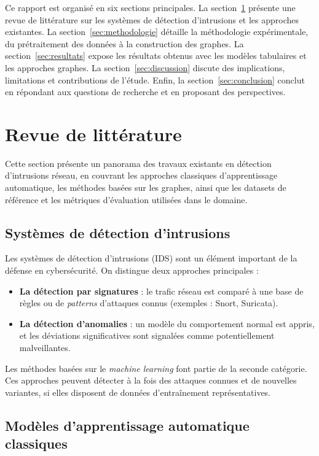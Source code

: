 ﻿\documentclass[11pt,a4paper]{article}
\begin{document}
Ce rapport est organisé en six sections principales. La section~\ref{sec:revue} présente une revue de littérature sur les systèmes de détection d'intrusions et les approches existantes. La section~\ref{sec:methodologie} détaille la méthodologie expérimentale, du prétraitement des données à la construction des graphes. La section~\ref{sec:resultats} expose les résultats obtenus avec les modèles tabulaires et les approches graphes. La section~\ref{sec:discussion} discute des implications, limitations et contributions de l'étude. Enfin, la section~\ref{sec:conclusion} conclut en répondant aux questions de recherche et en proposant des perspectives.

\section{Revue de littérature}
\label{sec:revue}

Cette section présente un panorama des travaux existants en détection d'intrusions réseau, en couvrant les approches classiques d'apprentissage automatique, les méthodes basées sur les graphes, ainsi que les datasets de référence et les métriques d'évaluation utilisées dans le domaine.

\subsection{Systèmes de détection d'intrusions}

Les systèmes de détection d'intrusions (IDS) sont un élément important de la défense en cybersécurité. On distingue deux approches principales :
\begin{itemize}
    \item \textbf{La détection par signatures} : le trafic réseau est comparé à une base de règles ou de \emph{patterns} d'attaques connus (exemples : Snort, Suricata).
    \item \textbf{La détection d'anomalies} : un modèle du comportement normal est appris, et les déviations significatives sont signalées comme potentiellement malveillantes.
\end{itemize}

Les méthodes basées sur le \emph{machine learning} font partie de la seconde catégorie. Ces approches peuvent détecter à la fois des attaques connues et de nouvelles variantes, si elles disposent de données d'entraînement représentatives.

\subsection{Modèles d'apprentissage automatique classiques}
\end{document}
